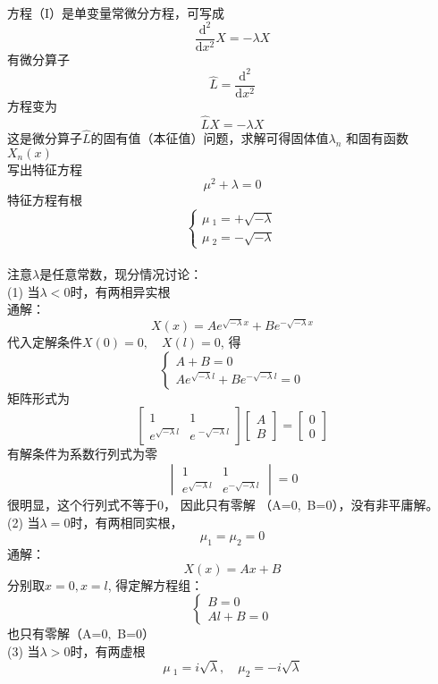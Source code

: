 ~~\\ 
方程（I）是单变量常微分方程，可写成
$$ \frac{\mathrm{d^2}}{\mathrm{d}x^2} X = -\lambda X  $$ 
有微分算子
$$ \hat{L} = \frac{\mathrm{d^2}}{\mathrm{d}x^2} $$
方程变为
$$ \hat{L} X = -\lambda X  $$ 
这是微分算子$\hat{L}$的固有值（本征值）问题，求解可得固体值$ \lambda _n $ 和固有函数  $X_n(x)$ \\
写出特征方程
$$ \mu^2 +\lambda =0  $$ 
特征方程有根
$$\begin{cases}
		\mu~_1 =+\sqrt{-\lambda}\\
		\mu~_2 =-\sqrt{-\lambda}
	\end{cases}$$
~~\\	
注意$\lambda$是任意常数，现分情况讨论：
~~\\
(1) 当$\lambda < 0$时，有两相异实根\\
通解：$$ X(x)=A e^{\sqrt{-\lambda}x} + B e^{-\sqrt{-\lambda}x}  $$ 
代入定解条件$X(0)=0, \quad X(l)=0$, 得
$$ \begin{cases}
		 A + B = 0 \\
		 A e^{\sqrt{-\lambda}l} + B e^{-\sqrt{-\lambda} l} =0
	\end{cases} $$ 
矩阵形式为
	$$ \left[
		\begin{array}{lll}
			1 & 1\\
			e ^{\sqrt{-\lambda} l} & e~^{-\sqrt{-\lambda} l}
		\end{array}
		\right]
		\left[
		\begin{array}{ll}
			A\\
			B
		\end{array}
		\right]
		=\left[
		\begin{array}{ll}
			0\\
			0
		\end{array}
		\right]  $$
有解条件为系数行列式为零
		$$ \begin{vmatrix}
				1 & 1 \\
				e^{\sqrt{-\lambda} l} & e ^{-\sqrt{-\lambda} l}
			\end{vmatrix}
			= 0  $$ 
很明显，这个行列式不等于0， 因此只有零解 （A=0,~B=0），没有非平庸解。
~~\\
(2) 当$\lambda = 0$时，有两相同实根， $$\mu_1 = \mu_2 =0 $$
通解：	$$ X(x) = Ax + B $$ 
分别取$x=0, x=l$, 得定解方程组：
$$\left\{
	\begin{array}{lll}
		B=0\\
		Al+B=0
	\end{array} \right. $$
也只有零解（A=0,~B=0）
~~\\
(3) 当$\lambda > 0$时，有两虚根 $$ \mu~_1 = i \sqrt{\lambda}, \quad \mu _2 = - i \sqrt{\lambda}$$	 
